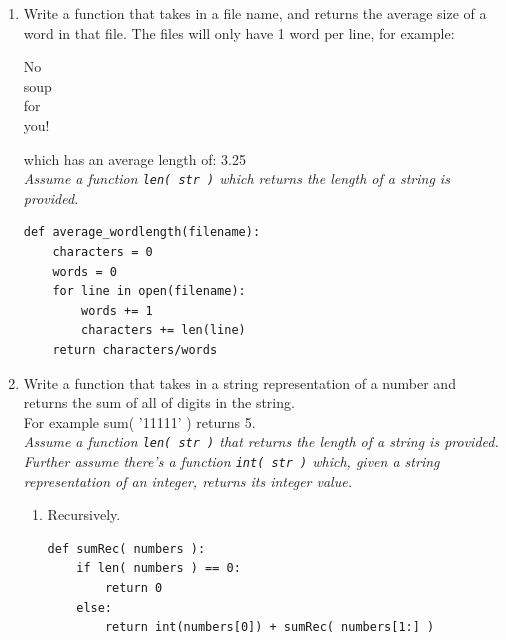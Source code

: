 \documentclass[11pt]{article}
\newenvironment{answer}{\large\lstset{basicstyle=\tiny}\color{white}}{}
\newenvironment{answer}{\large\lstset{basicstyle=\large}\color{red}}{}
\begin{document}
\begin{enumerate}
\begin{enumerate}
    \end{enumerate}

\vfill
\pagebreak

    \item Write a function that takes in a file name, and returns the average
        size of a word in that file. The files will only have 1 word per line,
        for example:

        \begin{center}
        No\\
        soup\\
        for\\
        you!
        \end{center}

        which has an average length of: 3.25 \\ \emph{Assume a function \texttt{len( str )} which returns the length of a string is provided.}


\begin{answer}
\begin{lstlisting}
def average_wordlength(filename):
    characters = 0
    words = 0
    for line in open(filename):
        words += 1
        characters += len(line)
    return characters/words
\end{lstlisting}
\end{answer}

    \item Write a function that takes in a string representation of a number and returns the sum
        of all of digits in the string. \\For example sum( '11111' ) returns 5. \\
        \emph{Assume a function \texttt{len( str )} that returns the length of a string is provided. \\
         Further assume there's a function \texttt{int( str )} which, given a string representation of an integer, returns its integer value.}

        \begin{enumerate}
            \item Recursively. 
\begin{answer}
\begin{lstlisting}
def sumRec( numbers ):
    if len( numbers ) == 0:
        return 0
    else:
        return int(numbers[0]) + sumRec( numbers[1:] )
\end{lstlisting}
\end{answer}


\end{enumerate}
\end{enumerate}
\end{document}
